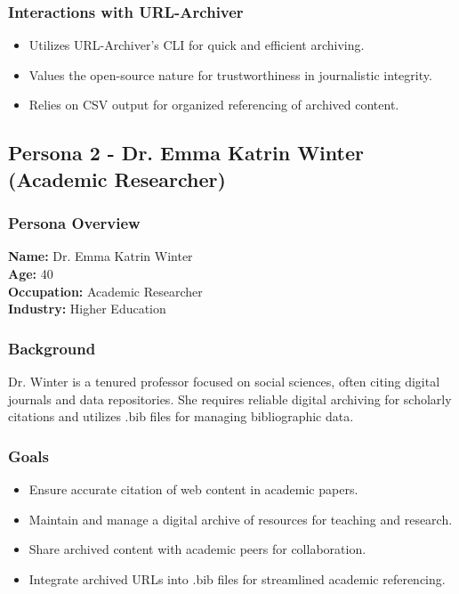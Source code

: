 \subsubsection{Interactions with URL-Archiver}
\begin{itemize}
    \item Utilizes URL-Archiver's CLI for quick and efficient archiving.
    \item Values the open-source nature for trustworthiness in journalistic integrity.
    \item Relies on CSV output for organized referencing of archived content.
\end{itemize}

\subsection{Persona 2 - Dr. Emma Katrin Winter (Academic Researcher)}

\subsubsection{Persona Overview}

\textbf{Name:} Dr. Emma Katrin Winter \\
\textbf{Age:} 40 \\
\textbf{Occupation:} Academic Researcher \\
\textbf{Industry:} Higher Education

\subsubsection{Background}
Dr. Winter is a tenured professor focused on social sciences, often citing digital journals and data repositories.
She requires reliable digital archiving for scholarly citations and utilizes .bib files for managing bibliographic data.

\subsubsection{Goals}
\begin{itemize}
    \item Ensure accurate citation of web content in academic papers.
    \item Maintain and manage a digital archive of resources for teaching and research.
    \item Share archived content with academic peers for collaboration.
    \item Integrate archived URLs into .bib files for streamlined academic referencing.
\end{itemize}

